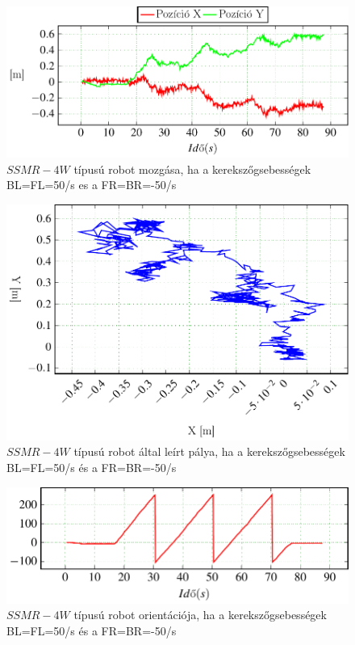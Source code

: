 \begin{figure}[H]
  \includegraphics{tikz/Left_n50Right50a.pdf}
  \caption{$SSMR-4W$ típusú robot mozgása, ha a kerekszőgsebességek BL=FL=50\degree/s es a FR=BR=-50\degree/s}
  \label{fig:Left_n50Right50a}
\end{figure}


\begin{figure}[H]
  \includegraphics[scale=1]{tikz/Left_n50Right50b.pdf}
  \caption{$SSMR-4W$ típusú robot által leírt pálya, ha a kerekszőgsebességek BL=FL=50\degree/s és a FR=BR=-50\degree/s}
    \label{fig:Left_n50Right50b}
\end{figure}



\begin{figure}[H]
  \includegraphics{tikz/Left_n50Right50c.pdf}
  \caption{$SSMR-4W$ típusú robot orientációja,  ha a kerekszőgsebességek BL=FL=50\degree/s és a FR=BR=-50\degree/s}
    \label{fig:Left_n50Right50c}
\end{figure}

